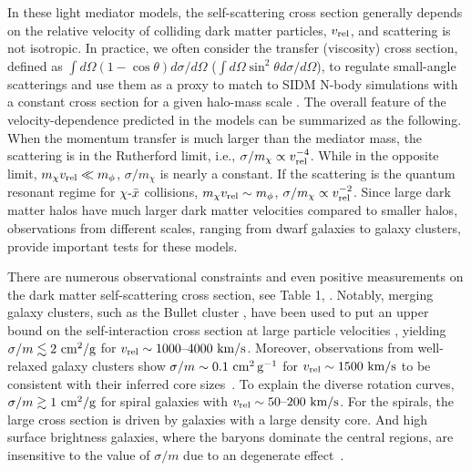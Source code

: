 In these light mediator models, the self-scattering cross section generally depends on the relative velocity of colliding dark matter particles, $v_{\rm rel}$, and scattering is not isotropic. In practice, we often consider the transfer (viscosity) cross section, defined as $\int d\Omega(1-\cos\theta)d\sigma/d\Omega$ ($\int d\Omega\sin^2\theta d\sigma/d\Omega$), to regulate small-angle scatterings and use them as a proxy to match to SIDM N-body simulations with a constant cross section for a given halo-mass scale \citep[see][]{Tulin:2013teo,Kahlhoefer:2013dca}. The overall feature of the velocity-dependence predicted in the models can be summarized as the following. When the momentum transfer is much larger than the mediator mass, the scattering is in the Rutherford limit, i.e., $\sigma/m_\chi\propto v^{-4}_{\rm rel}$. While in the opposite limit, $m_\chi v_{\rm rel}\ll m_\phi$, $\sigma/m_\chi$ is nearly a constant. If the scattering is the quantum resonant regime for $\chi\textup{-}\bar{x}$ collisions, $m_\chi v_{\rm rel}\sim m_\phi$, $\sigma/m_\chi\propto v^{-2}_{\rm rel}$. Since large dark matter halos have much larger dark matter velocities compared to smaller halos, observations from different scales, ranging from dwarf galaxies to galaxy clusters, provide important tests for these models.




There are numerous observational constraints and even positive measurements on the dark matter self-scattering cross section, see Table 1, \cite{Tulin:2017ara}. Notably, merging galaxy clusters, such as the Bullet cluster   \citep{Randall:2007ph,Robertson17BC}, have been used to put an upper bound on the self-interaction cross section at large particle velocities \citep[see\eg][]{Kahlhoefer:2013dca,Kahlhoefer:2015vua,Harvey:2016bqd,Robertson:2016qef,Wittman:2017gxn}, yielding $\sigma/m\lesssim 2~{\rm cm^2/g}$ for $v_{\rm rel}\sim 1000\textup{--}4000~{\rm km/s}$. Moreover, observations from well-relaxed galaxy clusters \citep{Newman++11,Newman++13a,Newman++13b} show $\sigma/m\sim0.1\mathrm{\,\mathrm{\,cm}^2\mathrm{\,g}^{-1}}$ for $v_{\rm rel}\sim1500~{\rm km/s}$ to be consistent with their inferred core sizes~\citep{Kaplinghat:2015aga}. To explain the diverse rotation curves, $\sigma/m\gtrsim1~{\rm cm^2/g}$ for spiral galaxies with $v_{\rm rel}\sim50\textup{--}200~{\rm km/s}$. For the spirals, the large cross section is driven by galaxies with a large density core. And high surface brightness galaxies, where the baryons dominate the central regions, are insensitive to the value of $\sigma/m$ due to an degenerate effect~\citep{Kamada:2016euw,Ren:2018jpt}. 

